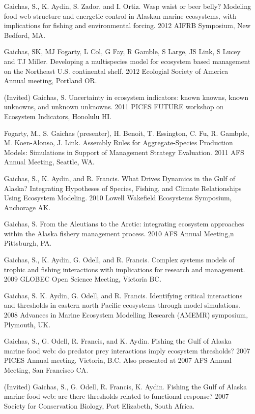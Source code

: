 \documentclass[11pt, a4paper]{awesome-cv}
\begin{document}
Gaichas, S., K. Aydin, S. Zador, and I. Ortiz. Wasp waist or beer belly?
Modeling food web structure and energetic control in Alaskan marine
ecosystems, with implications for fishing and environmental forcing.
2012 AIFRB Symposium, New Bedford, MA.

Gaichas, SK, MJ Fogarty, L Col, G Fay, R Gamble, S Large, JS Link, S
Lucey and TJ Miller. Developing a multispecies model for ecosystem based
management on the Northeast U.S. continental shelf. 2012 Ecologial
Society of America Annual meeting, Portland OR.

(Invited) Gaichas, S. Uncertainty in ecosystem indicators: known knowns,
known unknowns, and unknown unknowns. 2011 PICES FUTURE workshop on
Ecosystem Indicators, Honolulu HI.

Fogarty, M., S. Gaichas (presenter), H. Benoit, T. Essington, C. Fu, R.
Gambple, M. Koen-Alonso, J. Link. Assembly Rules for Aggregate-Species
Production Models: Simulations in Support of Management Strategy
Evaluation. 2011 AFS Annual Meeting, Seattle, WA.

Gaichas, S., K. Aydin, and R. Francis. What Drives Dynamics in the Gulf
of Alaska? Integrating Hypotheses of Species, Fishing, and Climate
Relationships Using Ecosystem Modeling. 2010 Lowell Wakefield Ecosystems
Symposium, Anchorage AK.

Gaichas, S. From the Aleutians to the Arctic: integrating ecosystem
approaches within the Alaska fishery management process. 2010 AFS Annual
Meeting,n Pittsburgh, PA.

Gaichas, S., K. Aydin, G. Odell, and R. Francis. Complex systems models
of trophic and fishing interactions with implications for research and
management. 2009 GLOBEC Open Science Meeting, Victoria BC.

Gaichas, S. K. Aydin, G. Odell, and R. Francis. Identifying critical
interactions and thresholds in eastern north Pacific ecosystems through
model simulations. 2008 Advances in Marine Ecosystem Modelling Research
(AMEMR) symposium, Plymouth, UK.

Gaichas, S., G. Odell, R. Francis, and K. Aydin. Fishing the Gulf of
Alaska marine food web: do predator prey interactions imply ecosystem
thresholds? 2007 PICES Annual meeting, Victoria, B.C. Also presented at
2007 AFS Annual Meeting, San Francisco CA.

(Invited) Gaichas, S., G. Odell, R. Francis, K. Aydin. Fishing the Gulf
of Alaska marine food web: are there thresholds related to functional
response? 2007 Society for Conservation Biology, Port Elizabeth, South
Africa.
\end{document}
